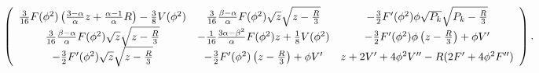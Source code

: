 \begin{equation}
\label{eq:prop0}
\left(
\begin{array}{c c c}
{3\over16}F(\phi^2)\left({3-\alpha\over\alpha}z
+{\alpha-1\over\alpha}R\right)-{3\over8}V(\phi^2)&
{3\over16}{\beta-\alpha\over\alpha}F(\phi^2)\sqrt{z}\sqrt{z-{R\over3}}&
-{3\over2}F'(\phi^2)\phi\sqrt{P_k}\sqrt{P_k-{R\over3}}\\
{3\over16}{\beta-\alpha\over\alpha}F(\phi^2)\sqrt{z}\sqrt{z-{R\over3}}&
-{1\over16}{3\alpha-\beta^2\over\alpha}F(\phi^2)z+{1\over8}V(\phi^2)&
-{3\over2}F'(\phi^2)\phi\left(z-{R\over3}\right)+\phi V'\\
-{3\over2}F'(\phi^2)\sqrt{z}\sqrt{z-{R\over3}}&
-{3\over2}F'(\phi^2)\left(z-{R\over3}\right)+\phi V'&
z+2V'+4\phi^2V''-R(2F'+4\phi^2F'')
\end{array}
\right).
\end{equation}


